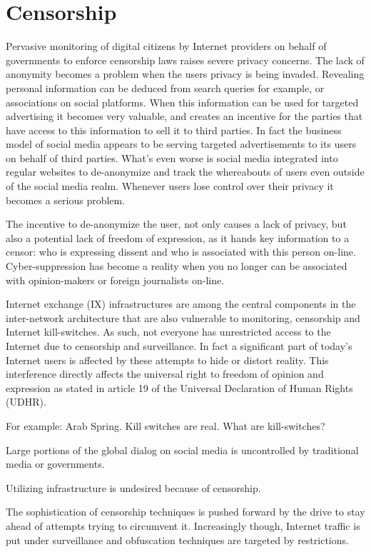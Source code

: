\section{Censorship}
Pervasive monitoring of digital citizens by Internet providers on behalf of governments to enforce censorship laws raises severe privacy concerns.
The lack of anonymity becomes a problem when the users privacy is being invaded.
Revealing personal information can be deduced from search queries for example, or associations on social platforms.
When this information can be used for targeted advertising it becomes very valuable, and creates an incentive for the parties that have access to this information to sell it to third parties.
In fact the business model of social media appears to be serving targeted advertisements to its users on behalf of third parties.
What's even worse is social media integrated into regular websites to de-anonymize and track the whereabouts of users even outside of the social media realm.
Whenever users lose control over their privacy it becomes a serious problem.


The incentive to de-anonymize the user, not only causes a lack of privacy, but also a potential lack of freedom of expression, as it hands key information to a censor: who is expressing dissent and who is associated with this person on-line.
Cyber-suppression has become a reality when you no longer can be associated with opinion-makers or foreign journalists on-line.

Internet exchange (IX) infrastructures are among the central components in the inter-network architecture that are also vulnerable to monitoring, censorship and Internet kill-switches.
As such, not everyone has unrestricted access to the Internet due to censorship and surveillance.
In fact a significant part of today's Internet users is affected by these attempts to hide or distort reality. %
This interference directly affects the universal right to freedom of opinion and expression as stated in article 19 of the Universal Declaration of Human Rights (UDHR).


For example: Arab Spring. Kill switches are real.
What are kill-switches?


Large portions of the global dialog on social media is uncontrolled by traditional media or governments.

Utilizing infrastructure is undesired because of censorship.


The sophistication of censorship techniques is pushed forward by the drive to stay ahead of attempts trying to circumvent it.
Increasingly though, Internet traffic is put under surveillance and obfuscation techniques are targeted by restrictions.


